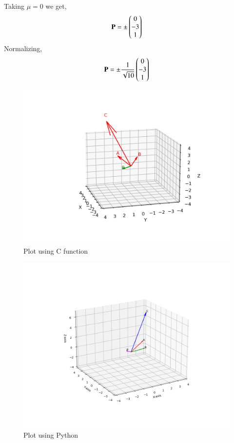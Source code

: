 \documentclass[journal,12pt,onecolumn]{IEEEtran}
\begin{document}
Taking $\mu=0$ we get,
\begin{align}
	\mathbf{P}=\pm \begin{pmatrix}0\\-3\\1\end{pmatrix}
\end{align}
Normalizing,
\begin{align}
\mathbf{P} = \pm \frac{1}{\sqrt{10}}\begin{pmatrix}0\\-3\\1\end{pmatrix}
\end{align}
\begin{figure}[H]
	\centering
	\includegraphics[scale=0.5]{img}
	\caption*{Plot using C function}
	\label{img}
\end{figure}
\begin{figure}[H]
	\centering
	\includegraphics[scale=0.5]{fig}
	\caption*{Plot using Python}
	\label{fig}
\end{figure}
\end{document}
